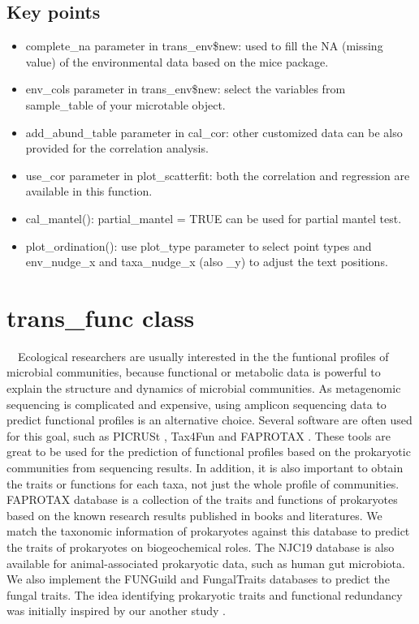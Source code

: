 \documentclass[
]{book}
\providecommand{\tightlist}{%
  \setlength{\itemsep}{0pt}\setlength{\parskip}{0pt}}
\begin{document}
\hypertarget{key-points-9}{%
\subsection{Key points}\label{key-points-9}}

\begin{itemize}
\tightlist
\item
  complete\_na parameter in trans\_env\$new: used to fill the NA (missing value) of the environmental data based on the mice package.
\item
  env\_cols parameter in trans\_env\$new: select the variables from sample\_table of your microtable object.
\item
  add\_abund\_table parameter in cal\_cor: other customized data can be also provided for the correlation analysis.
\item
  use\_cor parameter in plot\_scatterfit: both the correlation and regression are available in this function.
\item
  cal\_mantel(): partial\_mantel = TRUE can be used for partial mantel test.
\item
  plot\_ordination(): use plot\_type parameter to select point types and env\_nudge\_x and taxa\_nudge\_x (also \_y) to adjust the text positions.
\end{itemize}

\hypertarget{trans_func-class}{%
\section{trans\_func class}\label{trans_func-class}}

　Ecological researchers are usually interested in the the funtional profiles of microbial communities,
because functional or metabolic data is powerful to explain the structure and dynamics of microbial communities.
As metagenomic sequencing is complicated and expensive, using amplicon sequencing data to predict functional profiles is an alternative choice.
Several software are often used for this goal, such as PICRUSt \citep{Langille_Predictive_2013}, Tax4Fun \citep{Aßhauer_Tax4Fun_2015} and FAPROTAX \citep{Louca_High_2016, Louca_Decoupling_2016}.
These tools are great to be used for the prediction of functional profiles based on the prokaryotic communities from sequencing results.
In addition, it is also important to obtain the traits or functions for each taxa, not just the whole profile of communities.
FAPROTAX database is a collection of the traits and functions of prokaryotes based on the known research results published in books and literatures.
We match the taxonomic information of prokaryotes against this database to predict the traits of prokaryotes on biogeochemical roles.
The NJC19 database \citep{Lim_Large_2020} is also available for animal-associated prokaryotic data, such as human gut microbiota.
We also implement the FUNGuild \citep{Nguyen_FUNGuild_2016} and FungalTraits \citep{Polme_FungalTraits_2020} databases to predict the fungal traits.
The idea identifying prokaryotic traits and functional redundancy was initially inspired by our another study \citep{Liu_Microbial_2022}.
\end{document}
